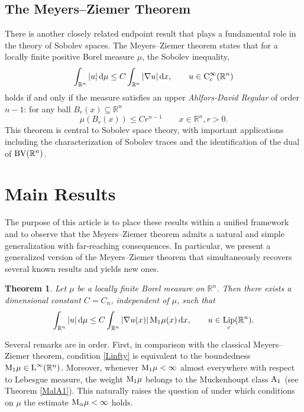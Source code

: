 \documentclass[11pt, a4paper, reqno]{amsart}
\newcommand{\R}{\mathbb R}
\newcommand{\dx}{\,{\mathrm dx}}
\newcommand{\dmu}{\,{\mathrm d\mu}}
\newcommand{\Lup}{\textup{L}}
\newcommand{\BV}{\textup{BV}}
\newcommand{\Con}{\textup{C}}
\DeclareMathOperator{\Lip}{\textup{Lip}}
\newtheorem{theorem}{Theorem}[section]
\theoremstyle{definition}
\theoremstyle{remark}
\begin{document}




\subsection{The Meyers--Ziemer Theorem}

There is another closely related endpoint result that plays a fundamental role in the theory of Sobolev spaces. The Meyers–Ziemer theorem states that for a locally finite positive Borel measure 
$\mu$, the Sobolev inequality,
$$\int_{\R^n}|u|\dmu\leq C\int_{\R^n}|\nabla u|\dx, \qquad u\in \Con_c^\infty(\R^n)$$
holds if and only if the measure satisfies an upper \emph{Ahlfors-David Regular} of order $n-1$: {for any} ball $B_r(x)\subseteq \R^n$
\begin{equation}\label{Linfty}\mu(B_r(x))\leq Cr^{n-1}\qquad x\in \R^n,r>0.\end{equation}
This theorem is central to Sobolev space theory, with important applications including the characterization of Sobolev traces and the identification of the dual of $\BV(\R^n)$.



\section{Main Results}


The purpose of this article is to place these results within a unified framework and to observe that the Meyers--Ziemer theorem admits a natural and simple generalization with far-reaching consequences. In particular, we present a generalized version of the Meyers–Ziemer theorem that simultaneously recovers several known results and yields new ones.

\begin{theorem}\label{Gradient}
Let $\mu$ be a locally finite Borel measure on $\R^n$. Then there exists a dimensional constant $C=C_n$, independent of $\mu$, such that
\begin{equation}\label{newMZthm}
\int_{\R^n} |u| \, \mathrm{d}\mu
\leq
C \int_{\R^n} |\nabla u(x)| \, \textup{M}_1 \mu(x)\, \mathrm{d}x,
\qquad
u \in \Lip_c(\R^n).
\end{equation}
\end{theorem}
Several remarks are in order. First, in comparison with the classical
Meyers--Ziemer theorem, condition \eqref{Linfty} is equivalent to the
boundedness $\textup{M}_1\mu \in \textup L^\infty(\R^n)$. Moreover, whenever
$\textup{M}_1\mu < \infty$ almost everywhere with respect to Lebesgue
measure, the weight $\textup{M}_1\mu$ belongs to the Muckenhoupt class
$\textup{A}_1$ (see Theorem \ref{MalA1}). {This naturally raises the question of under which conditions on $\mu$ the estimate $\textup M_\alpha \mu < \infty$ holds.}
\end{document}
